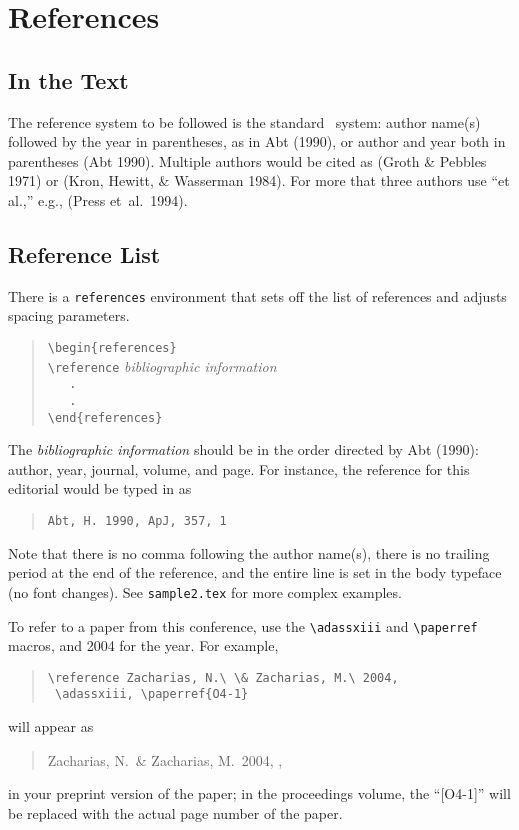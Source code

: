 \documentclass[11pt,twoside]{article}
\def\arg#1{{\it#1\/}}
\begin{document}
\section{References}

\subsection{In the Text}

The reference system to be followed is the standard \apj\ system: author
name(s) followed by the year in parentheses, as in Abt (1990), or author
and year both in parentheses (Abt 1990).  Multiple authors would be
cited as (Groth \& Pebbles 1971) or (Kron, Hewitt, \& Wasserman 1984).
For more that three authors use ``et al.,'' e.g., (Press et~al.\ 1994).

\subsection{Reference List}
\label{reflist}

There is a {\tt references} environment that sets off
the list of references and adjusts spacing parameters.
\begin{quote}
\verb+\begin{references}+\\
\verb+\reference+ \arg{bibliographic information}\\
\verb+   .+\\
\verb+   .+\\
\verb+\end{references}+
\end{quote}
The \arg{bibliographic information} should be in the order directed by
Abt (1990): author, year, journal, volume, and page.  For instance,
the reference for this editorial would be typed in as
\begin{quote}
\verb+Abt, H. 1990, ApJ, 357, 1+
\end{quote}
Note that there is no comma following the author name(s), there is no
trailing period at the end of the reference, and the entire line is set
in the body typeface (no font changes).  See {\tt sample2.tex} for more
complex examples.

To refer to a paper from this conference, use the \verb+\adassxiii+ and
\verb+\paperref+ macros, and 2004 for the year.  For example,
\begin{quote}
\verb+\reference Zacharias, N.\ \& Zacharias, M.\ 2004,+\\
\verb+ \adassxiii, \paperref{O4-1}+
\end{quote}
will appear as
\begin{quote}
Zacharias, N.\ \& Zacharias, M.\ 2004, \adassxiii, 
\end{quote}
in your preprint version of the paper; in the proceedings volume, the
``[O4-1]'' will be replaced with the actual page number of the paper.  
\end{document}
